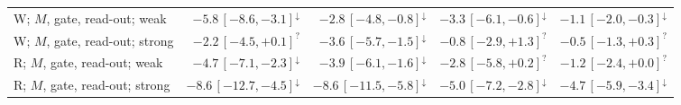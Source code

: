 \documentclass[11pt,a4paper]{article}
\theoremstyle{plain}
\theoremstyle{definition}
\theoremstyle{remark}
\begin{document}
\begin{table}[h]
{\begin{tabular}{@{}lrrrr@{}}
W; $M$, gate, read-out; weak & $-5.8\,[-8.6,-3.1]^{\downarrow}$ & $-2.8\,[-4.8,-0.8]^{\downarrow}$ & $-3.3\,[-6.1,-0.6]^{\downarrow}$ & $-1.1\,[-2.0,-0.3]^{\downarrow}$ \\
W; $M$, gate, read-out; strong & $-2.2\,[-4.5,+0.1]^{?}$ & $-3.6\,[-5.7,-1.5]^{\downarrow}$ & $-0.8\,[-2.9,+1.3]^{?}$ & $-0.5\,[-1.3,+0.3]^{?}$ \\
R; $M$, gate, read-out; weak & $-4.7\,[-7.1,-2.3]^{\downarrow}$ & $-3.9\,[-6.1,-1.6]^{\downarrow}$ & $-2.8\,[-5.8,+0.2]^{?}$ & $-1.2\,[-2.4,+0.0]^{?}$ \\
R; $M$, gate, read-out; strong & $-8.6\,[-12.7,-4.5]^{\downarrow}$ & $-8.6\,[-11.5,-5.8]^{\downarrow}$ & $-5.0\,[-7.2,-2.8]^{\downarrow}$ & $-4.7\,[-5.9,-3.4]^{\downarrow}$ \\
\bottomrule
\end{tabular}}
\end{table}
\end{document}
